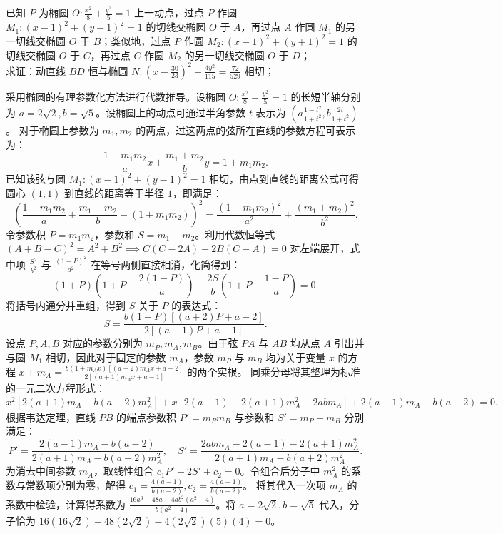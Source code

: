 \begin{exercise}
已知 \(P\) 为椭圆 \(O: \frac{x^2}{8} + \frac{y^2}{5} = 1\) 上一动点，过点 \(P\) 作圆 \(M_1: (x - 1)^2 + (y - 1)^2 = 1\) 的切线交椭圆 \(O\) 于 \(A\)，再过点 \(A\) 作圆 \(M_1\) 的另一切线交椭圆 \(O\) 于 \(B\)；类似地，过点 \(P\) 作圆 \(M_2: (x - 1)^2 + (y + 1)^2 = 1\) 的切线交椭圆 \(O\) 于 \(C\)，再过点 \(C\) 作圆 \(M_2\) 的另一切线交椭圆 \(O\) 于 \(D\)；\\
求证：动直线 \(BD\) 恒与椭圆 \(N: \left(x - \frac{30}{23}\right)^2 + \frac{4y^2}{115} = \frac{72}{529}\) 相切；
\end{exercise}
\begin{solution}
采用椭圆的有理参数化方法进行代数推导。设椭圆 $O: \frac{x^2}{8} + \frac{y^2}{5} = 1$ 的长短半轴分别为 $a = 2\sqrt{2}, b = \sqrt{5}$。设椭圆上的动点可通过半角参数 $t$ 表示为 $\left( a\frac{1-t^2}{1+t^2}, b\frac{2t}{1+t^2} \right)$。
对于椭圆上参数为 $m_1, m_2$ 的两点，过这两点的弦所在直线的参数方程可表示为：
\[ \frac{1-m_1m_2}{a}x + \frac{m_1+m_2}{b}y = 1+m_1m_2. \]
已知该弦与圆 $M_1: (x-1)^2 + (y-1)^2 = 1$ 相切，由点到直线的距离公式可得圆心 $(1,1)$ 到直线的距离等于半径 $1$，即满足：
\[ \left( \frac{1-m_1m_2}{a} + \frac{m_1+m_2}{b} - (1+m_1m_2) \right)^2 = \frac{(1-m_1m_2)^2}{a^2} + \frac{(m_1+m_2)^2}{b^2}. \]
令参数积 $P = m_1m_2$，参数和 $S = m_1+m_2$。利用代数恒等式 $(A+B-C)^2 = A^2+B^2 \implies C(C-2A) - 2B(C-A) = 0$ 对左端展开，式中项 $\frac{S^2}{b^2}$ 与 $\frac{(1-P)^2}{a^2}$ 在等号两侧直接相消，化简得到：
\[ (1+P)\left( 1+P - \frac{2(1-P)}{a} \right) - \frac{2S}{b}\left( 1+P - \frac{1-P}{a} \right) = 0. \]
将括号内通分并重组，得到 $S$ 关于 $P$ 的表达式：
\[ S = \frac{b(1+P)[(a+2)P + a-2]}{2[(a+1)P + a-1]}. \]
设点 $P, A, B$ 对应的参数分别为 $m_P, m_A, m_B$。由于弦 $PA$ 与 $AB$ 均从点 $A$ 引出并与圆 $M_1$ 相切，因此对于固定的参数 $m_A$，参数 $m_P$ 与 $m_B$ 均为关于变量 $x$ 的方程 $x+m_A = \frac{b(1+m_A x)[(a+2)m_A x + a-2]}{2[(a+1)m_A x + a-1]}$ 的两个实根。
同乘分母将其整理为标准的一元二次方程形式：
\[ x^2 [ 2(a+1)m_A - b(a+2)m_A^2 ] + x [ 2(a-1) + 2(a+1)m_A^2 - 2ab m_A ] + 2(a-1)m_A - b(a-2) = 0. \]
根据韦达定理，直线 $PB$ 的端点参数积 $P' = m_P m_B$ 与参数和 $S' = m_P + m_B$ 分别满足：
\[ P' = \frac{2(a-1)m_A - b(a-2)}{2(a+1)m_A - b(a+2)m_A^2}, \quad S' = \frac{2ab m_A - 2(a-1) - 2(a+1)m_A^2}{2(a+1)m_A - b(a+2)m_A^2}. \]
为消去中间参数 $m_A$，取线性组合 $c_1 P' - 2 S' + c_2 = 0$。令组合后分子中 $m_A^2$ 的系数与常数项分别为零，解得 $c_1 = \frac{4(a-1)}{b(a-2)}, c_2 = \frac{4(a+1)}{b(a+2)}$。
将其代入一次项 $m_A$ 的系数中检验，计算得系数为 $\frac{16a^3 - 48a - 4ab^2(a^2-4)}{b(a^2-4)}$。将 $a=2\sqrt{2}, b=\sqrt{5}$ 代入，分子恰为 $16(16\sqrt{2}) - 48(2\sqrt{2}) - 4(2\sqrt{2})(5)(4) = 0$。

\end{solution}
